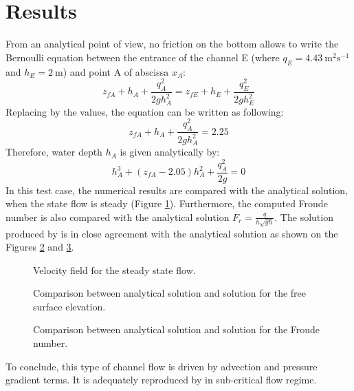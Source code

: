 \section{Results}
\bigskip
From an analytical point of view, no friction on the bottom allows to write the Bernoulli 
equation between the entrance of the channel E (where $q_E = 4.43~\text{m}^2\text{s}^{-1}$ 
and $h_E = 2~\text{m}$) and point A of abscissa $x_A$:
\begin{equation*}
  z_{fA}+h_{A}+ \frac{q_{A}^{2}}{2gh_{A}^{2}}=z_{fE}+h_{E}+ 
  \frac{q_{E}^{2}}{2gh_{E}^{2}}
\end{equation*}
Replacing by the values, the equation can be written as following:
\begin{equation*}
  z_{fA}+h_{A}+ \frac{q_{A}^{2}}{2gh_{A}^{2}}=2.25
\end{equation*}
Therefore, water depth $h_A$ is given analytically by:	  
\begin{equation}
h_{A}^{3}+(z_{fA}-2.05)h_{A}^{2}+\frac{q_{A}^{2}}{2g}=0
\label{t2d:bumpflu:eq:ha}
\end{equation}
In this test case, the numerical results are compared with the 
analytical solution, when the state flow is steady 
(Figure \ref{t2d:bumpflu:fig:velo}). Furthermore, the computed 
Froude number is also compared with the analytical solution 
$\displaystyle F_{r}=\frac{q}{h\sqrt{gh}}$.
The solution produced by  is in close agreement with 
the analytical solution as shown on the Figures \ref{t2d:bumpflu:fig:h} and \ref{t2d:bumpflu:fig:fr}. 

\begin{figure}[!htbp]
 \centering
 \caption{Velocity field for the steady state flow.}
 \label{t2d:bumpflu:fig:velo}
\end{figure}
\begin{figure}[!htbp]
 \centering
 \caption{Comparison between analytical solution and  
 solution for the free surface elevation.}
 \label{t2d:bumpflu:fig:h}
\end{figure}
\begin{figure}[!htbp]
 \centering
 \caption{Comparison between analytical solution and  
 solution for the Froude number.}
 \label{t2d:bumpflu:fig:fr}
\end{figure}

\bigskip
To conclude, this type of channel flow is driven by advection 
and pressure gradient terms. It is adequately reproduced by 
 in sub-critical flow regime.

